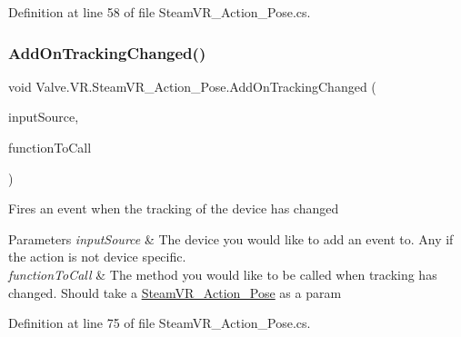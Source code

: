 Definition at line 58 of file Steam\+V\+R\+\_\+\+Action\+\_\+\+Pose.\+cs.

\mbox{\label{class_valve_1_1_v_r_1_1_steam_v_r___action___pose_ae0f2f16ddb64f4acf9842851ce9f437c}} 
\subsubsection{\texorpdfstring{AddOnTrackingChanged()}{AddOnTrackingChanged()}}
{\footnotesize\ttfamily void Valve.\+V\+R.\+Steam\+V\+R\+\_\+\+Action\+\_\+\+Pose.\+Add\+On\+Tracking\+Changed (\begin{DoxyParamCaption}\item[{\mbox{\hyperlink{namespace_valve_1_1_v_r_a82e5bf501cc3aa155444ee3f0662853f}{Steam\+V\+R\+\_\+\+Input\+\_\+\+Sources}}}]{input\+Source,  }\item[{\mbox{\hyperlink{class_valve_1_1_v_r_1_1_steam_v_r___action___pose_a52e352705659c14685cf8a88ef4bafd6}{Tracking\+Change\+Handler}}}]{function\+To\+Call }\end{DoxyParamCaption})}



Fires an event when the tracking of the device has changed 


\begin{DoxyParams}{Parameters}
{\em input\+Source} & The device you would like to add an event to. Any if the action is not device specific.\\
\hline
{\em function\+To\+Call} & The method you would like to be called when tracking has changed. Should take a \mbox{\hyperlink{class_valve_1_1_v_r_1_1_steam_v_r___action___pose}{Steam\+V\+R\+\_\+\+Action\+\_\+\+Pose}} as a param\\
\hline
\end{DoxyParams}


Definition at line 75 of file Steam\+V\+R\+\_\+\+Action\+\_\+\+Pose.\+cs.

\mbox{\label{class_valve_1_1_v_r_1_1_steam_v_r___action___pose_a3be9aaaa89040d6d76699c2528ad3c90}} 
